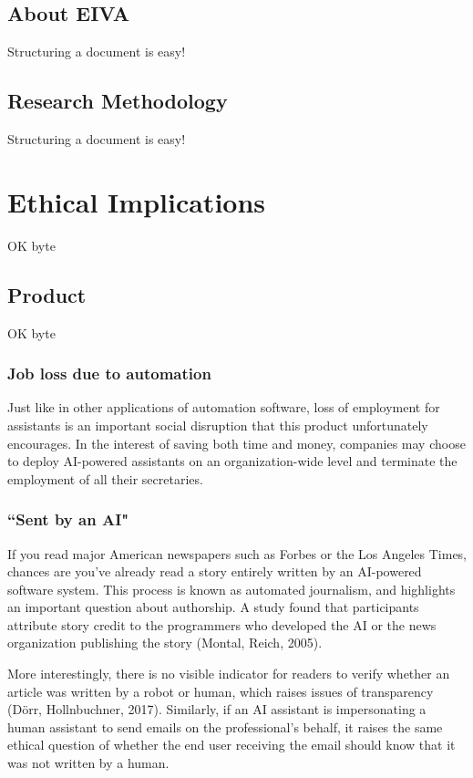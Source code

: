 \documentclass{article}
\begin{document}
\subsection{About EIVA}

Structuring a document is easy!

\subsection{Research Methodology}

Structuring a document is easy!

\section{Ethical Implications}

OK byte

\subsection{Product}

OK byte

\subsubsection{Job loss due to automation}

Just like in other applications of automation software, loss of employment for assistants is an important social disruption that this product unfortunately encourages. In the interest of saving both time and money, companies may choose to deploy AI-powered assistants on an organization-wide level and terminate the employment of all their secretaries.

\subsubsection{``Sent by an AI"}

If you read major American newspapers such as Forbes or the Los Angeles Times, chances are you’ve already read a story entirely written by an AI-powered software system. This process is known as automated journalism, and highlights an important question about authorship. A study found that participants attribute story credit to the programmers who developed the AI or the news organization publishing the story (Montal, Reich, 2005).

More interestingly, there is no visible indicator for readers to verify whether an article was written by a robot or human, which raises issues of transparency (Dörr, Hollnbuchner, 2017). Similarly, if an AI assistant is impersonating a human assistant to send emails on the professional's behalf, it raises the same ethical question of whether the end user receiving the email should know that it was not written by a human.
\end{document}
